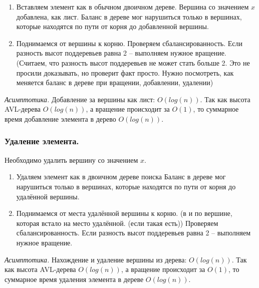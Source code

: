 \Alg
\begin{enumerate}
    \item Вставляем элемент как в обычном двоичном дереве.
    Вершина со значением $x$ добавлена, как лист. Баланс в дереве мог нарушиться только в вершинах, которые находятся по пути от корня до добавленной вершины.
    \item Поднимаемся от вершины к корню. Проверяем сбалансированность. Если разность высот поддеревьев равна 2 – выполняем нужное вращение. (Считаем, что разность высот поддеревьев не может стать больше 2. Это не просили доказывать, но проверит факт просто. Нужно посмотреть, как меняется баланс в дереве при вращении, добавлении, удалении)
\end{enumerate}

\textit{Асимптотика.} Добавление за вершины как лист: $O(log(n))$. Так как высота AVL-дерева $O(log(n))$, а вращение происходит за $O(1)$, то суммарное время добавление элемента в дерево $O(log(n))$. 

\subsubsection*{Удаление элемента.}

Необходимо удалить вершину со значением $x$. 

\Alg
\begin{enumerate}
    \item Удаляем элемент как в двоичном дереве поиска
    Баланс в дереве мог нарушиться только в вершинах, которые находятся по пути от корня до удалённой вершины.
    \item Поднимаемся от места удалённой вершины к корню. (в и по вершине, которая встало на место удалённой. (если такая есть)) Проверяем сбалансированность. Если разность высот поддеревьев равна 2 – выполняем нужное вращение.
\end{enumerate}

\textit{Асимптотика.} Нахождение и удаление вершины из дерева: $O(log(n))$. Так как высота AVL-дерева $O(log(n))$, а вращение происходит за $O(1)$, то суммарное время удаления элемента в дереве $O(log(n))$. 

\pagebreak